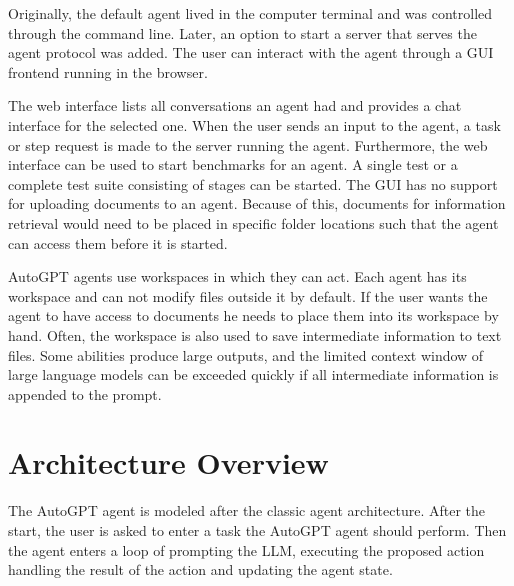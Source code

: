 \documentclass[../main.tex]{subfiles}
\begin{document}

Originally, the default agent lived in the computer terminal and was controlled through the command line.
Later, an option to start a server that serves the agent protocol was added.
The user can interact with the agent through a GUI frontend running in the browser.

The web interface lists all conversations an agent had and provides a chat interface for the selected one.
When the user sends an input to the agent, a task or step request is made to the server running the agent.
Furthermore, the web interface can be used to start benchmarks for an agent.
A single test or a complete test suite consisting of stages can be started.
The GUI has no support for uploading documents to an agent.
Because of this, documents for information retrieval would need to be placed in specific folder locations
such that the agent can access them before it is started.

AutoGPT agents use workspaces in which they can act.
Each agent has its workspace and can not modify files outside it by default.
If the user wants the agent to have access to documents he needs to place them into its workspace by hand.
Often, the workspace is also used to save intermediate information to text files.
Some abilities produce large outputs,
and the limited context window of large language models can be exceeded quickly
if all intermediate information is appended to the prompt.

\section{Architecture Overview}

The AutoGPT agent is modeled after the classic agent architecture.
After the start,
the user is asked to enter a task the AutoGPT agent should perform.
Then the agent enters a loop of prompting the LLM,
executing the proposed action
handling the result of the action and updating the agent state.
\end{document}
